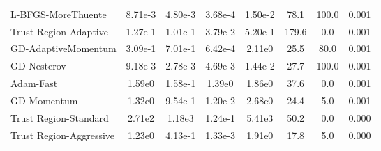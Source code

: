 \documentclass{article}
\begin{document}
\begin{table}[htbp]
{\begin{tabular}{p{2.5cm}*{7}{c}}
L-BFGS-MoreThuente & 8.71e-3 & 4.80e-3 & 3.68e-4 & 1.50e-2 & 78.1 & 100.0 & 0.001 \\
Trust Region-Adaptive & 1.27e-1 & 1.01e-1 & 3.79e-2 & 5.20e-1 & 179.6 & 0.0 & 0.001 \\
GD-AdaptiveMomentum & 3.09e-1 & 7.01e-1 & 6.42e-4 & 2.11e0 & 25.5 & 80.0 & 0.001 \\
GD-Nesterov & 9.18e-3 & 2.78e-3 & 4.69e-3 & 1.44e-2 & 27.7 & 100.0 & 0.001 \\
Adam-Fast & 1.59e0 & 1.58e-1 & 1.39e0 & 1.86e0 & 37.6 & 0.0 & 0.001 \\
GD-Momentum & 1.32e0 & 9.54e-1 & 1.20e-2 & 2.68e0 & 24.4 & 5.0 & 0.001 \\
Trust Region-Standard & 2.71e2 & 1.18e3 & 1.24e-1 & 5.41e3 & 50.2 & 0.0 & 0.000 \\
Trust Region-Aggressive & 1.23e0 & 4.13e-1 & 1.33e-3 & 1.91e0 & 17.8 & 5.0 & 0.000 \\
\bottomrule
\end{tabular}
}
\end{table}
\end{document}

